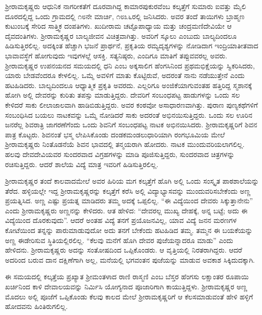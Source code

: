 ಶ‍್ರೀರಾಮಕೃಷ್ಣರು ಆಧುನಿಕ ನಾಗರೀಕತೆಗೆ ದೂರವಾಗಿದ್ದ ಕಾಮಾರಪುಕುರವೆಂಬ ಕಲ್ಕತ್ತೆಗೆ ಸುಮಾರು ಐವತ್ತು ಮೈಲಿ ದೂರದಲ್ಲಿದ್ದ ಒಂದು ಗ್ರಾಮದಲ್ಲಿ ೧೮ನೇ ಮಾರ್ಚಿ, ೧೮೩೬ರಲ್ಲಿ ಜನಿಸಿದರು. ಅವರ ತಂದೆ ತಾಯಿಗಳು ಬ್ರಾಹ್ಮಣ ಕುಟುಂಬಕ್ಕೆ ಸೇರಿದ ಸಾತ್ತ್ವಿಕ ದಂಪತಿಗಳು. ಖುದೀರಾಮ ಚಟ್ಟೊಪಾಧ್ಯಾಯ ಮತ್ತು ಚಂದ್ರಮಣಿದೇವಿಯೇ ಆ ದೈವದಂತಿಗಳು. ಶ‍್ರೀರಾಮಕೃಷ್ಣರ ಬಾಲ್ಯಜೀವನ ವಿಚಿತ್ರವಾಗಿತ್ತು. ಅವರಿಗೆ ಸ್ಕೂಲು ಎಂಬುದು ಬಾಲ್ಯದಿಂದಲೂ ಹಿಡಿಸುತ್ತಿರಲಿಲ್ಲ. ಅದಕ್ಕಿಂತ ಹೆಚ್ಚಾಗಿ ಭಜನೆ ಪ್ರಾರ್ಥನೆ, ಪ್ರಕೃತಿಯ ರಮ್ಯದೃಶ್ಯಗಳನ್ನು ನೋಡಿದಾಗ ಇಂದ್ರಿಯಾತೀತವಾದ ಭಾವಾವಸ್ಥೆಗೆ ಹೋಗುವುದು ಇವುಗಳಲ್ಲೆ ಆಸಕ್ತಿ. ಸತ್ಯನಿಷ್ಠರು, ಎಂದಿಗೂ ಮಾತಿಗೆ ತಪ್ಪುವವರಲ್ಲ ಅವರು. ಶ‍್ರೀರಾಮಕೃಷ್ಣರ ಉಪನಯನದ ಸಮಯದಲ್ಲಿ ಧನಿ ಎಂಬ ಅಕ್ಕಸಾಲಿಗ ಹೆಂಗಸಿನಿಂದ ಪ್ರಥಮಭಿಕ್ಷೆಯನ್ನು ಸ್ವಿಕರಿಸಿದರು, ಯಾರು ಬೇಡವೆಂದರೂ ಕೇಳಲಿಲ್ಲ. ಒಮ್ಮೆ ಅವಳಿಗೆ ಮಾತು ಕೊಟ್ಟಿರುವೆ, ಅದರಂತೆ ನಾನು ನಡೆಯುತ್ತೇನೆ ಎಂದು ಹಟಹಿಡಿದರು. ಬಾಲ್ಯದಿಂದಲೂ ಆಧ್ಯಾತ್ಮಿಕ ಪ್ರಕೃತಿ ಅವರದು. ಎಲ್ಲರಿಗೂ ಅಂಜಿಕೆಯಾಗುವಂತಹ ಹತ್ತಿರಿದ್ದ ಸ್ಮಶಾನಕ್ಕೆ ಹೋಗಿ ಅಲ್ಲಿ ದೇವರನ್ನು ಕುರಿತು ತಪಸ್ಸು ಮಾಡುತ್ತಿದ್ದರು. ದೇವರಿಗೆ ಸಂಬಂಧಪಟ್ಟ ಹಾಡುಗಳನ್ನು ಒಂದು ಸಲ ಕೇಳಿದರೆ ಸಾಕು ಲೀಲಾಜಾಲವಾಗಿ ಹಾಡಿಬಿಡುತ್ತಿದ್ದರು. ಅವರ ಕಂಠವೋ ಅಸಾಧಾರಣವಾಗಿತ್ತು. ಪುರಾಣ ಪುಣ್ಯಕಥೆಗಳಿಗೆ ಸಂಬಂಧಿಸಿದ ಬಯಲು ನಾಟಕವನ್ನು ಒಮ್ಮೆ ನೋಡಿದರೆ ಸಾಕು ಅದರಂತೆ ಅಭಿನಯಿಸುತ್ತಿದ್ದರು. ಒಂದು ಸಲ ಊರಿನ ಜನರೆಲ್ಲ ಶಿವರಾತ್ರಿ ಜಾಗರಣೆಗೆಂದು ಒಂದು ಶಿವನಿಗೆ ಸಂಬಂಧಪಟ್ಟ ನಾಟಕ ಅಭಿನಯಿಸಿದರು. ಶ‍್ರೀರಾಮಕೃಷ್ಣರಿಗೆ ಶಿವನ ಪಾತ್ರ ಕೊಟ್ಟರು. ಶಿವನಂತೆ ಭಸ್ಮ ಲೇಪಿಸಿಕೊಂಡು ದಂಡಕಮಂಡಲುಧಾರಿಯಾಗಿ ರಂಗಭೂಮಿಯ ಮೇಲೆ ಶ‍್ರೀರಾಮಕೃಷ್ಣರು ನಿಂತೊಡನೆಯೆ ಶಿವನ ಭಾವದಲ್ಲಿ ತನ್ಮಯರಾಗಿ ಹೋದರು. ನಾಟಕ ಮುಂದುವರಿಯಲಾಗಲಿಲ್ಲ. ಹಲವು ದೇವದೇವಿಯವರ ಸುಂದರವಾದ ವಿಗ್ರಹಗಳನ್ನು ಮಾಡಿ ಪೂಜಿಸುತ್ತಿದ್ದರು, ಸುಂದರವಾದ ಚಿತ್ರಗಳನ್ನು ರಚಿಸುತ್ತಿದ್ದರು. ಆದರೆ ಶಾಲೆಯ ವಿದ್ಯೆ ಮಾತ್ರ ಇವರಿಗೆ ಹಿಡಿಸುತ್ತಿರಲಿಲ್ಲ.

ಶ‍್ರೀರಾಮಕೃಷ್ಣರ ತಂದೆ ಕಾಲವಾದಮೇಲೆ ಅವರ ಹಿರಿಯ ಮಗ ಕಲ್ಕತ್ತೆಗೆ ಹೊಗಿ ಅಲ್ಲಿ ಒಂದು ಸಂಸ್ಕೃತ ಪಾಠಶಾಲೆಯನ್ನು ತೆರೆದ. ಹಳ್ಳಿಯಲ್ಲೇ ಇದ್ದ ಶ‍್ರೀರಾಮಕೃಷ್ಣರನ್ನು ಕಲ್ಕತ್ತೆಗೆ ಕರೆಸಿ ಅಲ್ಲಿ ವಿದ್ಯಾಭ್ಯಾಸವನ್ನು ಮುಂದುವರಿಸಬೇಕೆಂದು ಅಣ್ಣ ಪ್ರಯತ್ನಿಸಿದ. ಅಣ್ಣ ಎಷ್ಟು ಪ್ರಯತ್ನ ಮಾಡಿದರು ತಮ್ಮ ಅದಕ್ಕೆ ಒಪ್ಪಲಿಲ್ಲ. “ಈ ವಿದ್ಯೆಯಿಂದ ದೇವರು ಸಿಕ್ಕುತ್ತಾನೇನು” ಎಂದು ಶ‍್ರೀರಾಮಕೃಷ್ಣರು ಅಣ್ಣನನ್ನು ಕೇಳಿದರು. ಆತ ಹೇಳಿದ: “ದೇವರಲ್ಲ ಮುಖ್ಯ ದೇಹಕ್ಕೆ, ಅನ್ನ ಬಟ್ಟೆ; ಅದು ಈ ವಿದ್ಯೆಯಿಂದ ದೊರಕುವುದು”. ಆದರೆ ಅಂತಹ ವಿದ್ಯೆ ತನಗೆ ಪ್ರಯೊಜನವಿಲ್ಲ, ಯಾವ ವಿದ್ಯೆ ಜನನ ಮರಣಗಳ ಕೋಟೆಯಿಂದ ತನ್ನನ್ನು ಪಾರುಮಾಡುವುದೋ ಅದು ತನಗೆ ಬೇಕೆಂದು ಹಟಹಿಡಿದ ತಮ್ಮ. ತಮ್ಮನ ಈ ಬಯಕೆಯನ್ನು ಅಣ್ಣ ಈಡೇರಿಸುವ ಸ್ಥಿತಿಯಲ್ಲಿರಲಿಲ್ಲ. “ಕೆಲವು ಮನೆಗೆ ಹೊಗಿ ದೇವರ ಪುಜೆಯನ್ನಾದರೂ ಮಾಡು” ಎಂದು ಹೇಳಿದನು. ಶ‍್ರೀರಾಮಕೃಷ್ಣರು ಅದನ್ನು ಸಂತೋಷದಿಂದ ಒಪ್ಪಿಕೊಂಡರು. ಆ ವೃತ್ತಿಯಲ್ಲಿ ನಿರತರಾಗಿದ್ದರು. ಆದರೆ ಅದರಿಂದ ಬರುವ ದಾನ ದಕ್ಷಿಣೆಗಾಗಿ ಅಲ್ಲ, ಮನೆಯಲ್ಲಿ ಭಗವಂತನ ಪುಜೆಯನ್ನು ಮಾಡುವ ಅವಕಾಶ ಸಿಕ್ಕಿದುದಕ್ಕಾಗಿ.

ಈ ಸಮಯದಲ್ಲಿ ಕಲ್ಕತ್ತೆಯ ಪ್ರಖ್ಯಾತ ಶ‍್ರೀಮಂತಳಾದ ರಾಣಿ ರಾಸ್ಮಣಿ ಎಂಬ ಬೆಸ್ತರ ಹೆಂಗಸು ಲಕ್ಷಾಂತರ ರೂಪಾಯಿ ಖರ್ಚಿನಿಂದ ಕಾಳಿ ದೇವಾಲಯವನ್ನು ನಿರ್ಮಿಸಿ ಯೋಗ್ಯನಾದ ಪೂಜಾರಿಗಾಗಿ ಕಾಯುತ್ತಿದ್ದಳು. ಶ‍್ರೀರಾಮಕೃಷ್ಣರ ಅಣ್ಣ ಮೊದಲು ಅಲ್ಲಿ ಪೂಜೆಗೆ ಒಪ್ಪಿಕೊಂಡು ಕೆಲವು ಕಾಲದ ಮೇಲೆ ಶ‍್ರೀರಾಮಕೃಷ್ಣರಿಗೆ ಆ ಕೆಲಸಮಾಡುವಂತೆ ಹೇಳಿ ಹಳ್ಳಿಗೆ ಹೋದವನು ಹಿಂತಿರುಗಲಿಲ್ಲ.

